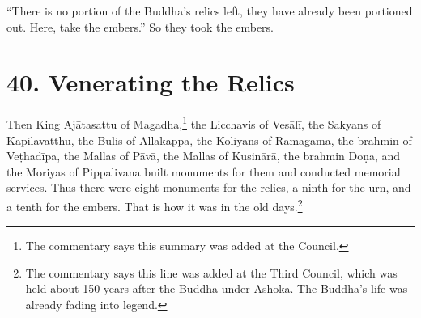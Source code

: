 \documentclass[12pt,openany]{book}%
\begin{document}
“There is no portion of the Buddha’s relics left, they have already been portioned out. Here, take the embers.” So they took the embers. 

\section*{40. Venerating the Relics }

Then King \textsanskrit{Ajātasattu} of Magadha,\footnote{The commentary says this summary was added at the Council. } the Licchavis of \textsanskrit{Vesālī}, the Sakyans of Kapilavatthu, the Bulis of Allakappa, the Koliyans of \textsanskrit{Rāmagāma}, the brahmin of \textsanskrit{Veṭhadīpa}, the Mallas of \textsanskrit{Pāvā}, the Mallas of \textsanskrit{Kusinārā}, the brahmin \textsanskrit{Doṇa}, and the Moriyas of Pippalivana built monuments for them and conducted memorial services. Thus there were eight monuments for the relics, a ninth for the urn, and a tenth for the embers. That is how it was in the old days.\footnote{The commentary says this line was added at the Third Council, which was held about 150 years after the Buddha under Ashoka. The Buddha’s life was already fading into legend. } 
\end{document}
